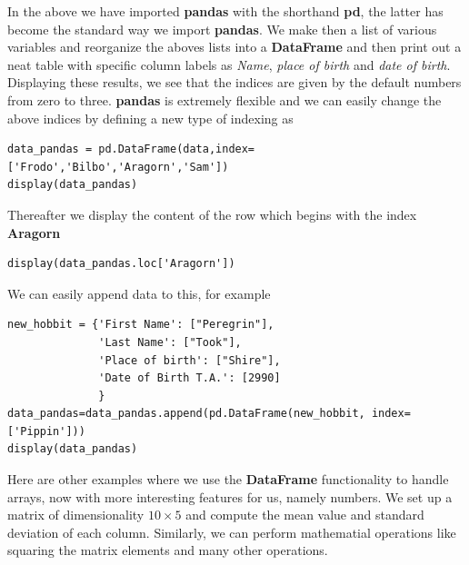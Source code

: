\documentclass{beamer}
\begin{document}
\begin{frame}
\begin{verbatim}
\end{verbatim}


In the above we have imported \textbf{pandas} with the shorthand \textbf{pd}, the latter has become the standard way we import \textbf{pandas}. We make then a list of various variables
and reorganize the aboves lists into a \textbf{DataFrame} and then print out  a neat table with specific column labels as \emph{Name}, \emph{place of birth} and \emph{date of birth}.
Displaying these results, we see that the indices are given by the default numbers from zero to three.
\textbf{pandas} is extremely flexible and we can easily change the above indices by defining a new type of indexing as



\begin{verbatim}
data_pandas = pd.DataFrame(data,index=['Frodo','Bilbo','Aragorn','Sam'])
display(data_pandas)

\end{verbatim}

Thereafter we display the content of the row which begins with the index \textbf{Aragorn}


\begin{verbatim}
display(data_pandas.loc['Aragorn'])

\end{verbatim}


We can easily append data to this, for example








\begin{verbatim}
new_hobbit = {'First Name': ["Peregrin"],
              'Last Name': ["Took"],
              'Place of birth': ["Shire"],
              'Date of Birth T.A.': [2990]
              }
data_pandas=data_pandas.append(pd.DataFrame(new_hobbit, index=['Pippin']))
display(data_pandas)

\end{verbatim}


Here are other examples where we use the \textbf{DataFrame} functionality to handle arrays, now with more interesting features for us, namely numbers. We set up a matrix 
of dimensionality $10\times 5$ and compute the mean value and standard deviation of each column. Similarly, we can perform mathematial operations like squaring the matrix elements and many other operations. 















\end{frame}
\end{document}
